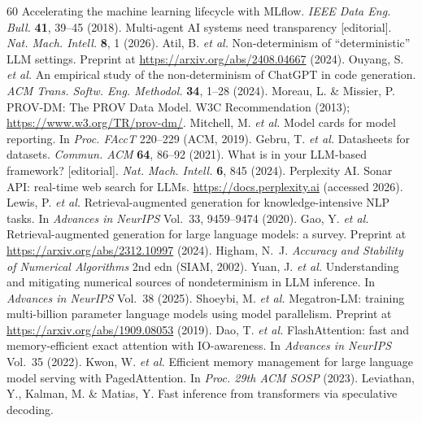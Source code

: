 \documentclass[sn-nature]{sn-jnl}
\begin{document}
\begin{thebibliography}{60}
Accelerating the machine learning lifecycle with MLflow.
\emph{IEEE Data Eng. Bull.} \textbf{41}, 39--45 (2018).
Multi-agent AI systems need transparency [editorial].
\emph{Nat. Mach. Intell.} \textbf{8}, 1 (2026).
Atil, B. \emph{et al.}
Non-determinism of ``deterministic'' LLM settings.
Preprint at \url{https://arxiv.org/abs/2408.04667} (2024).
Ouyang, S. \emph{et al.}
An empirical study of the non-determinism of ChatGPT in code generation.
\emph{ACM Trans. Softw. Eng. Methodol.} \textbf{34}, 1--28 (2024).
Moreau, L. \& Missier, P.
PROV-DM: The PROV Data Model.
W3C Recommendation (2013); \url{https://www.w3.org/TR/prov-dm/}.
Mitchell, M. \emph{et al.}
Model cards for model reporting.
In \emph{Proc. FAccT} 220--229 (ACM, 2019).
Gebru, T. \emph{et al.}
Datasheets for datasets.
\emph{Commun. ACM} \textbf{64}, 86--92 (2021).
What is in your LLM-based framework? [editorial].
\emph{Nat. Mach. Intell.} \textbf{6}, 845 (2024).
Perplexity AI.
Sonar API: real-time web search for LLMs.
\url{https://docs.perplexity.ai} (accessed 2026).
Lewis, P. \emph{et al.}
Retrieval-augmented generation for knowledge-intensive NLP tasks.
In \emph{Advances in NeurIPS} Vol.~33, 9459--9474 (2020).
Gao, Y. \emph{et al.}
Retrieval-augmented generation for large language models: a survey.
Preprint at \url{https://arxiv.org/abs/2312.10997} (2024).
Higham, N.~J.
\emph{Accuracy and Stability of Numerical Algorithms} 2nd edn (SIAM, 2002).
Yuan, J. \emph{et al.}
Understanding and mitigating numerical sources of nondeterminism in LLM inference.
In \emph{Advances in NeurIPS} Vol.~38 (2025).
Shoeybi, M. \emph{et al.}
Megatron-LM: training multi-billion parameter language models using model parallelism.
Preprint at \url{https://arxiv.org/abs/1909.08053} (2019).
Dao, T. \emph{et al.}
FlashAttention: fast and memory-efficient exact attention with IO-awareness.
In \emph{Advances in NeurIPS} Vol.~35 (2022).
Kwon, W. \emph{et al.}
Efficient memory management for large language model serving with PagedAttention.
In \emph{Proc. 29th ACM SOSP} (2023).
Leviathan, Y., Kalman, M. \& Matias, Y.
Fast inference from transformers via speculative decoding.

\end{thebibliography}
\end{document}
